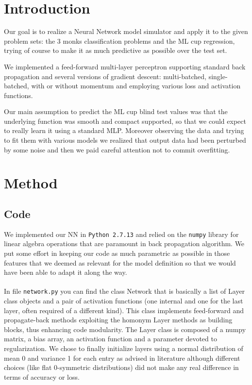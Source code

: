 \section{Introduction}

Our goal is to realize a Neural Network model simulator and apply it to the given problem sets: the 3 monks classification problems and the ML cup regression, trying of course to make it as much predictive as possible over the test set.

We implemented a feed-forward multi-layer perceptron supporting standard back propagation and several versions of gradient descent: multi-batched, single-batched, with or without momentum and employing various loss and activation functions.

Our main assumption to predict the ML cup blind test values was that the underlying function was smooth and compact supported, so that we could expect to really learn it using a standard MLP. Moreover observing the data and trying to fit them with various models we realized that output data had been perturbed by some noise and then we paid careful attention not to commit overfitting. 

\section{Method}

\subsection{Code}

We implemented our NN in \texttt{Python 2.7.13} and relied on the \texttt{numpy} library for linear algebra operations that are paramount in back propagation algorithm. We put some effort in keeping our code as much parametric as possible in those features that we deemed as relevant for the model definition so that we would have been able to adapt it along the way.

\paragraph{}
In file \texttt{network.py} you can find the class Network that is basically a list of Layer class objects and a pair of activation functions (one internal and one for the last layer, often required of a different kind). This class implements feed-forward and propagate-back methods exploiting the homonym Layer methods as building blocks, thus enhancing code modularity. The Layer class is composed of a numpy matrix, a bias array, an activation function and a parameter devoted to regularization. We chose to finally initialize layers using a normal distribution of mean 0 and variance 1 for each entry as advised in literature although different choices (like flat 0-symmetric distributions) did not make any real difference in terms of accuracy or loss.

